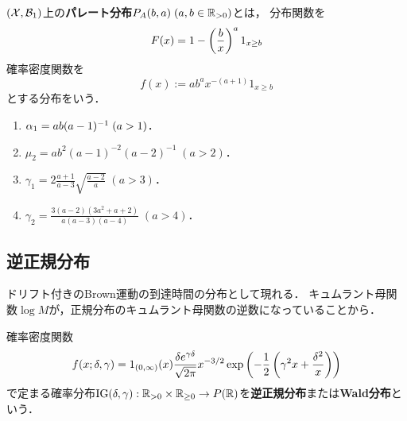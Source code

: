 \documentclass[uplatex,dvipdfmx]{jsreport}
\begin{document}
\begin{definition}
    $(\mathcal{X},\mathcal{B}_1)$上の\textbf{パレート分布}$P_A(b,a)\;(a,b\in\mathbb{R}_{>0})$とは，
    分布関数を
    \[F(x)=1-\left(\frac{b}{x}\right)^a1_{x\ge b}\]
    確率密度関数を
    \[f(x):=ab^ax^{-(a+1)}1_{x\ge b}\]
    とする分布をいう．
\end{definition}

\begin{proposition}\mbox{}
    \begin{enumerate}
        \item $\alpha_1=ab(a-1)^{-1}\;(a>1)$．
        \item $\mu_2=ab^2(a-1)^{-2}(a-2)^{-1}\;(a>2)$．
        \item $\gamma_1=2\frac{a+1}{a-3}\sqrt{\frac{a-2}{a}}\;(a>3)$．
        \item $\gamma_2=\frac{3(a-2)(3a^2+a+2)}{a(a-3)(a-4)}\;(a>4)$．
    \end{enumerate}
\end{proposition}

\subsection{逆正規分布}

\begin{tcolorbox}[colframe=ForestGreen, colback=ForestGreen!10!white,breakable,colbacktitle=ForestGreen!40!white,coltitle=black,fonttitle=\bfseries\sffamily,
title=]
    ドリフト付きのBrown運動の到達時間の分布として現れる．
    キュムラント母関数$\log M$が，正規分布のキュムラント母関数の逆数になっていることから．
\end{tcolorbox}

\begin{definition}
    確率密度関数
    \[f(x;\delta,\gamma)=1_{(0,\infty)}(x)\frac{\delta e^{\gamma\delta}}{\sqrt{2\pi}}x^{-3/2}\exp\left(-\frac{1}{2}\left(\gamma^2x+\frac{\delta^2}{x}\right)\right)\]
    で定まる確率分布$\mathrm{IG}(\delta,\gamma):\mathbb{R}_{>0}\times\mathbb{R}_{\ge0}\to P(\mathbb{R})$を\textbf{逆正規分布}または\textbf{Wald分布}という．
\end{definition}
\end{document}
